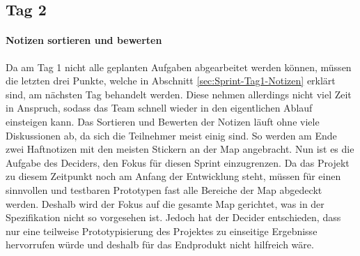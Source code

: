 \subsection*{\label{sec:Sprint-Umsetzung-Tag2}\thesubsection\quad Tag 2}
\paragraph{Notizen sortieren und bewerten}
Da am Tag 1 nicht alle geplanten Aufgaben abgearbeitet werden können, müssen die letzten drei Punkte, welche in Abschnitt \ref{sec:Sprint-Tag1-Notizen} erklärt sind, am nächsten Tag behandelt werden. Diese nehmen allerdings nicht viel Zeit in Anspruch, sodass das Team schnell wieder in den eigentlichen Ablauf einsteigen kann. Das Sortieren und Bewerten der Notizen läuft ohne viele Diskussionen ab, da sich die Teilnehmer meist einig sind. So werden am Ende zwei Haftnotizen mit den meisten Stickern an der Map angebracht. 
Nun ist es die Aufgabe des Deciders, den Fokus für diesen Sprint einzugrenzen. Da das Projekt zu diesem Zeitpunkt noch am Anfang der Entwicklung steht, müssen für einen sinnvollen und testbaren Prototypen fast alle Bereiche der Map abgedeckt werden. Deshalb wird der Fokus auf die gesamte Map gerichtet, was in der Spezifikation nicht so vorgesehen ist. Jedoch hat der Decider entschieden, dass nur eine teilweise Prototypisierung des Projektes zu einseitige Ergebnisse hervorrufen würde und deshalb für das Endprodukt nicht hilfreich wäre.



